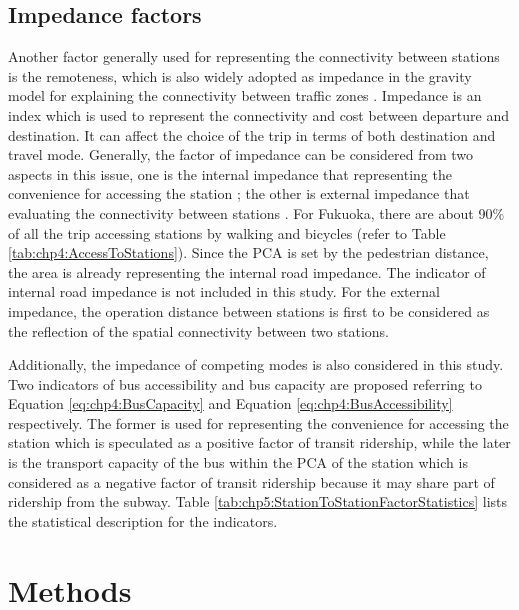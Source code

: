 %
\subsection{Impedance factors}
%
Another factor generally used for representing the connectivity between stations is the remoteness, which is also widely adopted as impedance in the gravity model for explaining the connectivity between traffic zones \cite{iwanow2007trade,kepaptsoglou2010gravity,nitsch2000national}. Impedance is an index which is used to represent the connectivity and cost between departure and destination. It can affect the choice of the trip in terms of both destination and travel mode. Generally, the factor of impedance can be considered from two aspects in this issue, one is the internal impedance that representing the convenience for accessing the station \cite{chu2004ridership,chakraborty2013land}; the other is external impedance that evaluating the connectivity between stations \cite{sohn2010factors}. For Fukuoka, there are about 90\% of all the trip accessing stations by walking and bicycles (refer to Table \ref{tab:chp4:AccessToStations}). Since the PCA is set by the pedestrian distance, the area is already representing the internal road impedance. The indicator of internal road impedance is not included in this study. For the external impedance, the operation distance between stations is first to be considered as the reflection of the spatial connectivity between two stations. 

Additionally, the impedance of competing modes is also considered in this study. Two indicators of bus accessibility and bus capacity are proposed referring to Equation \ref{eq:chp4:BusCapacity} and Equation \ref{eq:chp4:BusAccessibility} respectively. The former is used for representing the convenience for accessing the station which is speculated as a positive factor of transit ridership, while the later is the transport capacity of the bus within the PCA of the station which is considered as a negative factor of transit ridership because it may share part of ridership from the subway. Table \ref{tab:chp5:StationToStationFactorStatistics} lists the statistical description for the indicators.

%
\section{Methods}
%
